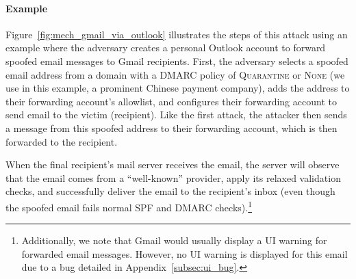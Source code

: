 \paragraph{Example}
Figure~\ref{fig:mech_gmail_via_outlook} illustrates the steps of this
attack using an example where the adversary creates a personal Outlook
account to forward spoofed email messages to Gmail recipients.  First,
the adversary selects a spoofed email address from a domain with a
DMARC policy of \textsc{Quarantine} or \textsc{None} (we use  in this example, a prominent Chinese payment company), adds the address
to their forwarding account's allowlist, and configures their
forwarding account to send email to the victim (recipient).  Like the
first attack, the attacker then sends a message from this spoofed address
to their forwarding account, which is then forwarded to the recipient.

When the final recipient's mail server receives
the email, the server will observe that the email comes from a
``well-known'' provider, apply its relaxed validation checks, and
successfully deliver the email to the recipient's inbox (even though
the spoofed email fails normal SPF and DMARC checks).\footnote{Additionally, we note that Gmail would usually display a UI warning for forwarded email messages. However, no UI warning is displayed for this email due to a bug detailed in Appendix~\ref{subsec:ui_bug}.}


